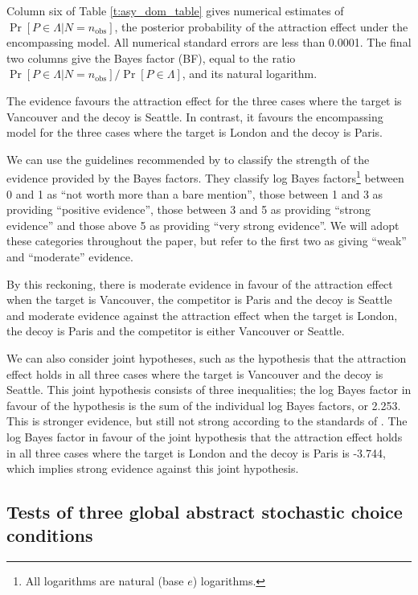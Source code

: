 \documentclass[11pt,letter]{article}
\begin{document}
Column six of Table \ref{t:asy_dom_table} gives numerical estimates of $\Pr[P \in \Lambda|N = n_{\mathrm{obs}}]$, the posterior probability of the attraction effect under the encompassing model.
All numerical standard errors are less than 0.0001.
The final two columns give the Bayes factor (BF), equal to the ratio $\Pr[P \in \Lambda|N=n_{\mathrm{obs}}]/\Pr[P \in \Lambda]$, and its natural logarithm.

The evidence favours the attraction effect for the three cases where the target is Vancouver and the decoy is Seattle.
In contrast, it favours the encompassing model for the three cases where the target is London and the decoy is Paris.

We can use the guidelines recommended by \citet{KassRaft95} to classify the strength of the evidence provided by the Bayes factors.
They classify log Bayes factors\footnote{All logarithms are natural (base $e$) logarithms.} between 0 and 1 as ``not worth more than a bare mention'', those between 1 and 3 as providing ``positive evidence'', those between 3 and 5 as providing ``strong evidence'' and those above 5 as providing ``very strong evidence''.
We will adopt these categories throughout the paper, but refer to the first two as giving ``weak'' and ``moderate'' evidence.

By this reckoning, there is moderate evidence in favour of the attraction effect when the target is Vancouver, the competitor is Paris and the decoy is Seattle and moderate evidence against the attraction effect when the target is London, the decoy is Paris and the competitor is either Vancouver or Seattle.

We can also consider joint hypotheses, such as the hypothesis that the attraction effect holds in all three cases where the target is Vancouver and the decoy is Seattle.
This joint hypothesis consists of three inequalities; the log Bayes factor in favour of the hypothesis is the sum of the individual log Bayes factors, or 2.253.
This is stronger evidence, but still not strong according to the standards of \citet{KassRaft95}.
The log Bayes factor in favour of the joint hypothesis that the attraction effect holds in all three cases where the target is London and the decoy is Paris is -3.744, which implies strong evidence against this joint hypothesis.

\subsection{Tests of three global abstract stochastic choice conditions}\label{s:global_tests}
\end{document}
